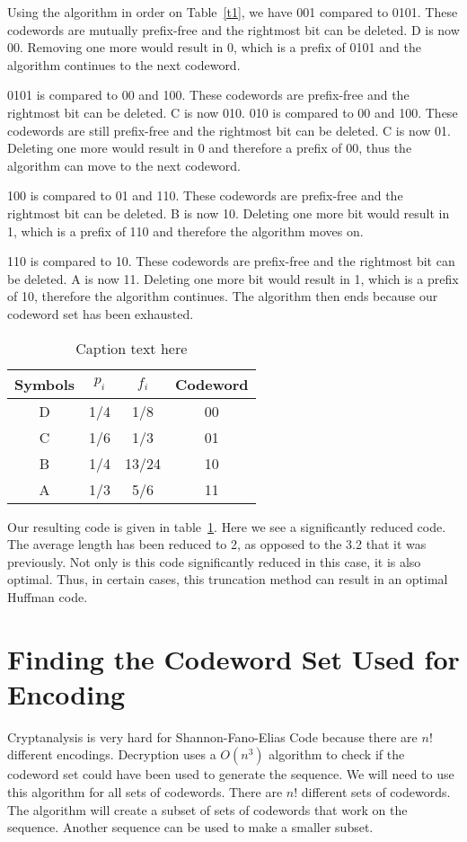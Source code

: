 \documentclass[10pt,letterpaper,notitlepage,draft]{article}
\theoremstyle{definition}
\begin{document}
Using the algorithm in order on Table~\ref{t1}, we have 
001 compared to 0101.  
These codewords are mutually prefix-free and the rightmost bit can be deleted.  
D is now 00.  
Removing one more would result in 0, which is a prefix of 0101 and the algorithm continues to the next codeword.

0101 is compared to 00 and 100.
These codewords are prefix-free and the rightmost bit can be deleted.
C is now 010.
010 is compared to 00 and 100.
These codewords are still prefix-free and the rightmost bit can be deleted.
C is now 01.
Deleting one more would result in 0 and therefore a prefix of 00, thus the algorithm can move to the next codeword.

100 is compared to 01 and 110.
These codewords are prefix-free and the rightmost bit can be deleted.
B is now 10.
Deleting one more bit would result in 1, which is a prefix of 110 and therefore the algorithm moves on.

110 is compared to 10.
These codewords are prefix-free and the rightmost bit can be deleted.
A is now 11.
Deleting one more bit would result in 1, which is a prefix of 10, therefore the algorithm continues.
The algorithm then ends because our codeword set has been exhausted.

\begin{table}[h]
\begin{center}
\begin{tabular}{|c|c|c|c|}
\hline
Symbols & $p_i$ & $f_i$ & Codeword \\
\hline
\hline
D & 1/4 & 1/8 & 00 \\
\hline
C & 1/6 & 1/3 & 01 \\
\hline
B & 1/4 & 13/24 & 10 \\
\hline
A & 1/3 & 5/6 & 11 \\
\hline
\end{tabular}
\end{center}
\caption{Caption text here}\label{t3}
\end{table}

Our resulting code is given in table~\ref{t3}.
Here we see a significantly reduced code. 
The average length has been reduced to 2, as opposed to the 3.2 that it was previously. 
Not only is this code significantly reduced in this case, it is also optimal. 
Thus, in certain cases, this truncation method can result in an optimal Huffman code.

\section{Finding the Codeword Set Used for Encoding}
Cryptanalysis is very hard for Shannon-Fano-Elias Code because there are $n!$ different encodings. 
Decryption uses a $O(n^3)$ algorithm to check if the codeword set could have been used to generate the sequence. 
We will need to use this algorithm for all sets of codewords. There are $n!$ different sets of codewords. 
The algorithm will create a subset of sets of codewords that work on the sequence.
Another sequence can be used to make a smaller subset.
\end{document}
